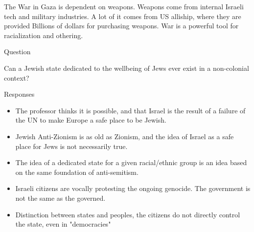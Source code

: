 \documentclass{report}
\begin{document}
\begin{description}
        \vspace{10}

        The War in Gaza is dependent on weapons. Weapons come from
        internal Israeli tech and military industries. A lot of it
        comes from US alliship, where they are provided Billions of 
        dollars for purchasing weapons. War is a powerful tool for
        racialization and othering.

        \begin{center}
        \end{center}

        \pagebreak
        \begin{mdframed}
            {\Large Question}

            Can a Jewish state dedicated to the wellbeing of Jews ever exist in a
            non-colonial context?

            Responses
            \begin{itemize}

                \item The professor thinks it is possible, and that Israel is the result
                    of a failure of the UN to make Europe a safe place to be Jewish.

                \item Jewish Anti-Zionism is as old as Zionism, and the idea of Israel
                    as a safe place for Jews is not necessarily true.

                \item The idea of a dedicated state for a given racial/ethnic group is 
                    an idea based on the same foundation of anti-semitism.

                \item Israeli citizens are vocally protesting the ongoing genocide. The
                    government is not the same as the governed.

                \item Distinction between states and peoples, the citizens do not directly
                    control the state, even in "democracies"


\end{itemize}
\end{mdframed}
\end{description}
\end{document}
